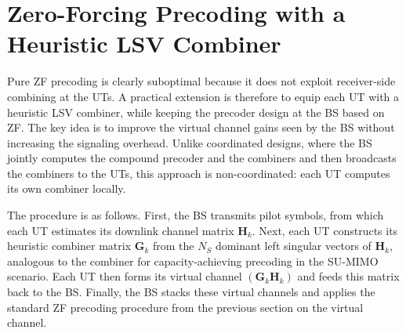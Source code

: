 \section{Zero-Forcing Precoding with a Heuristic LSV Combiner}
\label{section:mu_mimo_zf_lsv_precoding}

Pure \ac{ZF} precoding is clearly suboptimal because it does not exploit receiver-side combining at the \acp{UT}.
A practical extension is therefore to equip each \ac{UT} with a heuristic \acf{LSV} combiner, while keeping the precoder design at the \ac{BS} based on \ac{ZF}.
The key idea is to improve the virtual channel gains seen by the \ac{BS} without increasing the signaling overhead.
Unlike coordinated designs, where the \ac{BS} jointly computes the compound precoder and the combiners and then broadcasts the combiners to the \acp{UT}, this approach is non-coordinated: each \ac{UT} computes its own combiner locally.

The procedure is as follows.
First, the \ac{BS} transmits pilot symbols, from which each \ac{UT} estimates its downlink channel matrix $\mathbf{H}_k$.
Next, each \ac{UT} constructs its heuristic combiner matrix $\mathbf{G}_k$ from the $N_S$ dominant left singular vectors of $\mathbf{H}_k$, analogous to the combiner for capacity-achieving precoding in the \ac{SU}-\ac{MIMO} scenario.
Each \ac{UT} then forms its virtual channel $(\mathbf{G}_k \mathbf{H}_k)$ and feeds this matrix back to the \ac{BS}.
Finally, the \ac{BS} stacks these virtual channels and applies the standard \ac{ZF} precoding procedure from the previous section on the virtual channel.

